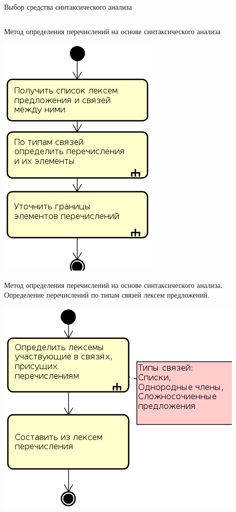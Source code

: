 \documentclass[10pt,ps,serif,mathserif]{beamer}
\begin{document}
\begin{frame}{Выбор средства синтаксического анализа}
\begin{tabular}{|l|c|c|c|c|}
        \end{tabular}
    \end{frame}
    \begin{frame}{Метод определения перечислений на основе синтаксического анализа}
        \begin{center}
            \includegraphics[height=0.7\textheight]{images/algorithm.png}
        \end{center}
    \end{frame}
    \begin{frame}{Метод определения перечислений на основе синтаксического анализа. Определение перечислений по типам связей лексем предложений.}
        \begin{center}
            \includegraphics[height=0.7\textheight]{images/algorithm1.png}
        \end{center}
    \end{frame}
\end{document}
